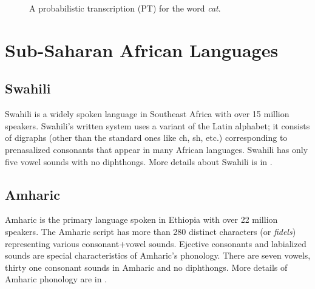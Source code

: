 \documentclass[a4paper]{article}
\newcommand{\mytikzscale}{0.9}
\newcommand{\myvspacefig}{\vspace{-4mm}}
\begin{document}
\begin{figure}
\begin{subfigure}
  \myvspacefig
  \caption{A probabilistic transcription (PT) for the word \emph{cat}.}
  \label{fig:pt}
  \end{subfigure}%
  \vspace{-1mm}
\end{figure}


\section{Sub-Saharan African Languages}  \vspace{-1mm}
\label{sec:Sub-Saharan African Languages}
\subsection{Swahili}  \vspace{-1mm}
Swahili is a widely spoken language in Southeast Africa with over 15 million speakers. Swahili's written system uses a variant of the Latin alphabet; it consists of digraphs (other than the standard ones like ch, sh, etc.) corresponding to prenasalized consonants that appear in many African languages. Swahili has only five vowel sounds with no diphthongs. More details about Swahili is in \cite{Gelas-SwahiliASR}.

\subsection{Amharic}  \vspace{-1mm}
Amharic is the primary language spoken in Ethiopia with over 22 million speakers. The Amharic script has more than 280 distinct characters (or {\em fidels}) representing various consonant+vowel sounds. Ejective consonants and labialized sounds are special characteristics of Amharic's phonology. There are seven vowels, thirty one consonant sounds in Amharic and no diphthongs. More details of Amharic phonology are in \cite{Tachbelie2014}.
\end{document}
